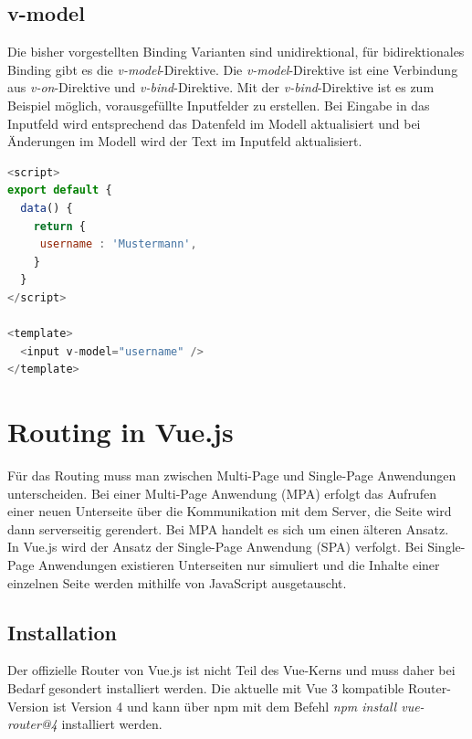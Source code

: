 
\subsection*{v-model}
Die bisher vorgestellten Binding Varianten sind unidirektional,
für bidirektionales Binding gibt es die \emph{v-model}-Direktive.
Die \emph{v-model}-Direktive ist eine Verbindung aus \emph{v-on}-Direktive
und \emph{v-bind}-Direktive.
Mit der \emph{v-bind}-Direktive ist es zum Beispiel möglich, vorausgefüllte Inputfelder zu erstellen.
Bei Eingabe in das Inputfeld wird entsprechend das Datenfeld im Modell aktualisiert
und bei Änderungen im Modell wird der Text im Inputfeld aktualisiert. \cite{vueComponentV-model}
\begin{lstlisting}[caption={\emph{v-model}-Direktive},language=javascript, label={lst:v-model-Direktive}]
<script>
export default {
  data() {
    return {
     username : 'Mustermann',
    }
  }
</script>

<template>
  <input v-model="username" />
</template>
\end{lstlisting}

\section{Routing in Vue.js}
Für das Routing muss man zwischen Multi-Page und Single-Page Anwendungen unterscheiden.
Bei einer Multi-Page Anwendung (MPA) erfolgt das Aufrufen einer neuen Unterseite über die Kommunikation
mit dem Server, die Seite wird dann serverseitig gerendert.
Bei MPA handelt es sich um einen älteren Ansatz.\cite[S. 262]{kaluvza2018comparison}
\\
In Vue.js wird der Ansatz der Single-Page Anwendung (SPA) verfolgt.
Bei Single-Page Anwendungen existieren Unterseiten nur simuliert und
die Inhalte einer einzelnen Seite werden mithilfe von JavaScript ausgetauscht. \cite[S. 174-175]{peterke2019}
\subsection*{Installation}
Der offizielle Router von Vue.js ist nicht Teil des Vue-Kerns und
muss daher bei Bedarf gesondert installiert werden.
Die aktuelle mit Vue 3 kompatible Router-Version ist Version 4 und
kann über npm mit dem Befehl \emph{npm install vue-router@4} installiert werden.\cite{vueRouterInstallation}


